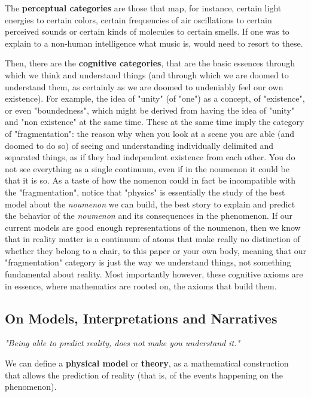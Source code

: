 \documentclass[11pt, a4paper]{article} %
\begin{document}
The \textbf{perceptual categories} are those that map, for instance, certain light energies to certain colors, certain frequencies of air oscillations to certain perceived sounds or certain kinds of molecules to certain smells. If one was to explain to a non-human intelligence what music is, would need to resort to these.

Then, there are the \textbf{cognitive categories}, that are the basic essences through which we think and understand things (and through which we are doomed to understand them, as certainly as we are doomed to undeniably feel our own existence). For example, the idea of "unity" (of "one") as a concept, of "existence", or even "boundedness", which might be derived from having the idea of "unity" and "non existence" at the same time. These at the same time imply the category of "fragmentation": the reason why when you look at a scene you are able (and doomed to do so) of seeing and understanding individually delimited and separated things, as if they had independent existence from each other. You do not see everything as a single continuum, even if in the noumenon it could be that it is so. As a taste of how the nomenon could in fact be incompatible with the "fragmentation", notice that "physics" is essentially the study of the best model about the {\em noumenon} we can build, the best story to explain and predict the behavior of the {\em noumenon} and its consequences in the phenomenon. If our current models are good enough representations of the noumenon, then we know that in reality matter is a continuum of atoms that make really no distinction of whether they belong to a chair, to this paper or your own body, meaning that our "fragmentation" category is just the way we understand things, not something fundamental about reality. Most importantly however, these cognitive axioms are in essence, where mathematics are rooted on, the axioms that build them.

\subsection*{On Models, Interpretations and Narratives}
\begin{flushright} \em "Being able to predict reality, does not make you understand it."
\end{flushright}

We can define a {\bf physical model} or {\bf theory}, as a mathematical construction that allows the prediction of reality (that is, of the events happening on the phenomenon).
\end{document}
